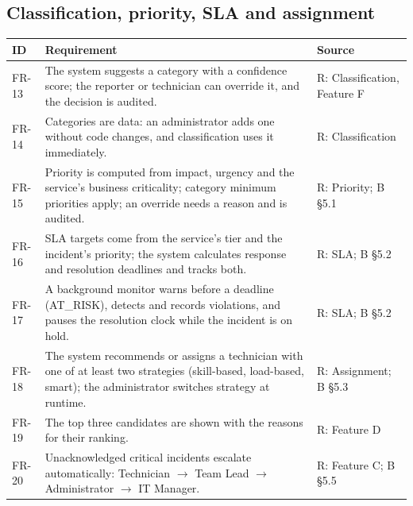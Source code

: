 \subsection*{Classification, priority, SLA and assignment}
\begin{longtable}{@{}l>{\raggedright\arraybackslash}p{9.6cm}l@{}}
\toprule
\textbf{ID} & \textbf{Requirement} & \textbf{Source} \\
\midrule
\endhead
FR-13 & The system suggests a category with a confidence score; the reporter or
  technician can override it, and the decision is audited. & R: Classification, Feature F \\
FR-14 & Categories are data: an administrator adds one without code changes, and
  classification uses it immediately. & R: Classification \\
FR-15 & Priority is computed from impact, urgency and the service's business criticality;
  category minimum priorities apply; an override needs a reason and is audited. &
  R: Priority; B §5.1 \\
FR-16 & SLA targets come from the service's tier and the incident's priority; the system
  calculates response and resolution deadlines and tracks both. & R: SLA; B §5.2 \\
FR-17 & A background monitor warns before a deadline (AT\_RISK), detects and records
  violations, and pauses the resolution clock while the incident is on hold. & R: SLA; B §5.2 \\
FR-18 & The system recommends or assigns a technician with one of at least two strategies
  (skill-based, load-based, smart); the administrator switches strategy at runtime. &
  R: Assignment; B §5.3 \\
FR-19 & The top three candidates are shown with the reasons for their ranking. & R: Feature D \\
FR-20 & Unacknowledged critical incidents escalate automatically: Technician $\rightarrow$ Team
  Lead $\rightarrow$ Administrator $\rightarrow$ IT Manager. & R: Feature C; B §5.5 \\
\bottomrule
\end{longtable}

